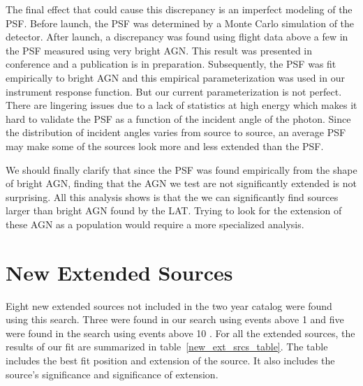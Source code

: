 \documentclass[12pt,preprint]{aastex}
\newcommand{\gev}{\text{GeV}\xspace}
\begin{document}
The final effect that could cause this discrepancy is an imperfect
modeling of the PSF.  Before launch, the PSF
was determined by a Monte Carlo simulation of the detector.
After launch, a discrepancy was found using flight data above a
few \gev in the PSF measured using very bright AGN.  This result
was presented in conference and a publication is in preparation.
Subsequently, the PSF was fit empirically to bright AGN and this
empirical parameterization was used in our instrument
response function.
But our current parameterization is not perfect. There are lingering
issues due to a lack of statistics at high energy which makes it hard to
validate the PSF as a function of the incident angle of the photon. Since
the distribution of incident angles varies from source to source, an
average PSF may make some of the sources look more and less extended
than the PSF.

We should finally clarify that since the PSF was found empirically
from the shape of bright AGN, finding that the AGN we test are not
significantly extended is not surprising.  All this analysis shows
is that the we can significantly find sources larger than bright AGN
found by the LAT.  Trying to look for the extension of these AGN as a
population would require a more specialized analysis.

\section{New Extended Sources}
\label{new_ext_srcs_section}


Eight new extended sources not included in the two year catalog were
found using this search. Three were found in our search using events
above 1 \gev and five were found in the search using events
above 10 \gev.
For all the extended sources, the results of our fit are summarized in
table~\ref{new_ext_srcs_table}. The table includes the best fit position and
extension of the source. It also includes the source's significance and
significance of extension.
\end{document}
